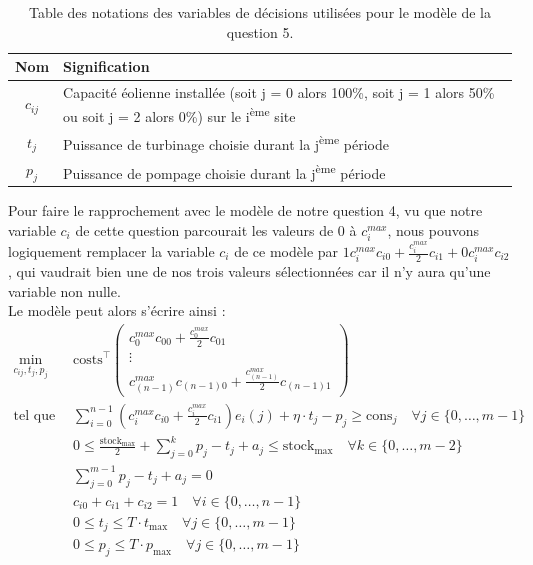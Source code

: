 \documentclass{article}
\begin{document}
\begin{table}[h!]
    \centering
    \renewcommand{\arraystretch}{1.5}%
    \begin{tabular}{|c || p{14cm} |} 
        \hline
        Nom & Signification\\
        \hline\hline
        $c_{ij}$ & Capacité éolienne installée (soit j = 0 alors 100\%, soit j = 1 alors 50\% ou soit j = 2 alors 0\%)
        sur le i\textsuperscript{ème} site \\
        $t_j$ & Puissance de turbinage choisie durant la j\textsuperscript{ème} période\\
        $p_j$ & Puissance de pompage choisie durant la j\textsuperscript{ème} période\\
        \hline
    \end{tabular}
    \caption{Table des notations des variables de décisions utilisées pour le modèle de la question 5.}
    \label{table:notations_variables_5}
\end{table} 
\noindent Pour faire le rapprochement avec le modèle de notre question 4, vu que notre variable $c_i$ de cette question parcourait
les valeurs de 0 à $c_i^{max}$, nous pouvons logiquement remplacer la variable $c_i$ de ce modèle 
par $1 c_i^{max} c_{i0} + \frac{c_i^{max}}{2}c_{i1} + 0 c_i^{max} c_{i2}$, qui vaudrait bien une de nos 
trois valeurs sélectionnées car il n'y aura qu'une variable non nulle. \\
Le modèle peut alors s'écrire ainsi :
\begin{align}
    \min_{c_{ij},t_j,p_j} \quad &\mathrm{costs}^\intercal \begin{pmatrix}
        c_0^{max} c_{00} + \frac{c_0^{max}}{2}c_{01} \\
        \vdots \\
        c_{(n-1)}^{max} c_{(n-1)0} + \frac{c_{(n-1)}^{max}}{2}c_{(n-1)1}
    \end{pmatrix} \nonumber\\
    \textrm{tel que} \quad & \sum_{i=0}^{n-1} (c_i^{max} c_{i0} + \frac{c_i^{max}}{2}c_{i1}) e_i(j) + \eta \cdot t_j - p_j \ge \mathrm{cons}_j \quad \forall j \in  \{ 0, \ldots, m-1 \}\label{eq:5_contr1}\\
    & 0 \le \frac{\mathrm{stock}_\mathrm{max}}{2}  + \sum_{j=0}^{k} p_j - t_j + a_j \le  \mathrm{stock}_\mathrm{max} \quad \forall k \in \{ 0, \ldots, m-2 \}\label{eq:5_contr2}\\
    & \sum_{j=0}^{m-1} p_j - t_j + a_j = 0 \label{eq:5_contr3}\\
    & c_{i0} + c_{i1} + c_{i2} = 1 \quad \forall i \in  \{ 0, \ldots, n-1 \} \label{eq:5_contr4}  \\
    & 0 \le t_j \le T \cdot t_\mathrm{max} \quad \forall j \in  \{ 0, \ldots, m-1 \} \label{eq:5_contr5}\\
    & 0 \le p_j \le T \cdot p_\mathrm{max} \quad \forall j \in  \{ 0, \ldots, m-1 \} \label{eq:5_contr6} 
\end{align}
\end{document}
